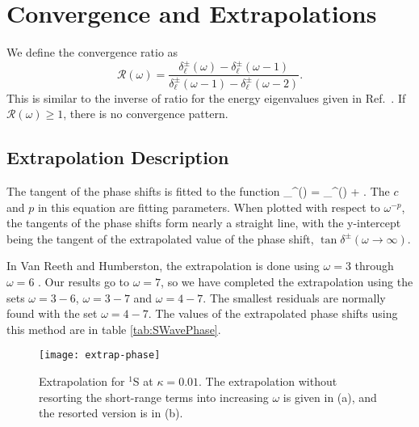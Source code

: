 \documentclass[Dissertation.tex]{subfiles}
\begin{document}





\section{Convergence and Extrapolations}
\label{sec:Extrapolations}

We define the convergence ratio as
\begin{equation}
\label{eq:ConvRatio}
\mathcal{R}(\omega) = \frac{\delta_\ell^\pm(\omega)-\delta_\ell^\pm(\omega-1)}
  {\delta_\ell^\pm(\omega-1)-\delta_\ell^\pm(\omega-2)}.
\end{equation}
This is similar to the inverse of ratio for the energy eigenvalues given in
Ref.~\cite{Yan1999}. If $\mathcal{R}(\omega) \geq 1$, there is no convergence pattern.

\subsection{Extrapolation Description}


The tangent of the phase shifts is fitted to the function
\beq
\label{eq:PhaseExtrap}
\tan \delta_\ell^\pm(\omega) = \tan \delta_\ell^\pm(\omega \to \infty) + .
\eeq
The $c$ and $p$ in this equation are fitting parameters. When plotted with respect to $\omega^{-p}$, the tangents of the phase shifts form nearly a straight line, with the y-intercept being the tangent of the extrapolated value of the phase shift, $\tan \delta^\pm(\omega \to \infty)$.

In Van Reeth and Humberston, the extrapolation is done using $\omega = 3$ through $\omega = 6$ \cite{VanReeth2003}. Our results go to $\omega = 7$, so we have completed the extrapolation using the sets $\omega = 3-6$, $\omega = 3-7$ and $\omega = 4-7$. The smallest residuals are normally found with the set $\omega = 4-7$. The values of the extrapolated phase shifts using this method are in table \ref{tab:SWavePhase}.

\begin{figure}[H]
	\centering
	\texttt{[image: extrap-phase]}
	\caption[Extrapolation for $^1$S at $\kappa = 0.01$]{Extrapolation for $^1$S at $\kappa = 0.01$. The extrapolation without resorting the short-range terms into increasing $\omega$ is given in (a), and the resorted version is in (b).}
	\label{fig:extrap-phase}
\end{figure}
\end{document}
